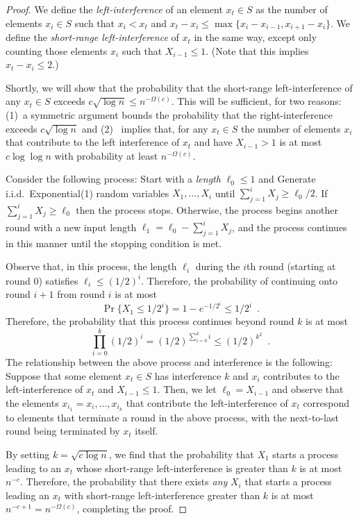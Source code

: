 \documentclass{patmorin}
\begin{document}
\begin{proof}
We define the \emph{left-interference} of an element $x_t\in S$ as
the number of elements $x_i\in S$ such that $x_i < x_t$ and $x_t-x_i
\le \max\{x_i-x_{i-1},x_{i+1}-x_i\}$.  We define the \emph{short-range
left-interference} of $x_t$ in the same way, except only counting those
elements $x_i$ such that $X_{i-1} \le 1$. (Note that this implies $x_t-x_i
\le 2$.)

Shortly, we will show that the probability that the short-range
left-interference of any $x_t\in S$ exceeds $c\sqrt{\log n}\le
n^{-\Omega(c)}$.  This will be sufficient, for two reasons: (1)~a
symmetric argument bounds the probability that the right-interference
exceeds $c\sqrt{\log n}$ and (2)~ implies that, for any
$x_t\in S$ the number of elements $x_i$ that contribute to the left
interference of $x_t$ and have $X_{i-1}>1$ is at most $c\log \log n$ with
probability at least $n^{-\Omega(c)}$.

Consider the following process: Start with a \emph{length} $\ell_0 \le 1$
and Generate i.i.d.\ Exponential(1) random variables $X_1,\ldots,X_i$
until $\sum_{j=1}^i {X_j} \ge \ell_0/2$. If $\sum_{j=1}^i {X_j} \ge
\ell_0$ then the process stops.  Otherwise, the process begins another
round with a new input length $\ell_1=\ell_0-\sum_{j=1}^i {X_j}$, and
the process continues in this manner until the stopping condition is met.

Observe that, in this process, the length $\ell_i$ during the $i$th
round (starting at round 0) satisfies $\ell_i\le (1/2)^i$.  Therefore,
the probability of continuing onto round $i+1$ from round $i$ is at most
\[
   \Pr\{X_1 \le 1/2^i\} = 1-e^{-1/2^i} \le 1/2^{i} \enspace .
\]
Therefore, the probability that this process continues beyond round $k$
is at most
\[
    \prod_{i=0}^{k} (1/2)^i = (1/2)^{\sum_{i=0}^{k} i} \le (1/2)^{k^2}
\enspace .
\]
The relationship between the above process and interference is the
following:  Suppose that some element $x_t\in S$ has interference $k$
and $x_i$ contributes to the left-interference of $x_t$ and $X_{i-1}\le
1$.  Then, we let $\ell_0=X_{i-1}$ and observe that the elements
$x_{i_1}=x_i,\ldots,x_{i_k}$ that contribute the left-interference of
$x_t$ correspond to elements that terminate a round in the above process,
with the next-to-last round being terminated by $x_t$ itself.

By setting $k=\sqrt{c\log n}$, we find that the probability that $X_{1}$
starts a process leading to an $x_t$ whose short-range left-interference is
greater than $k$ is at most $n^{-c}$.  Therefore, the probability that
there exists \emph{any} $X_i$ that starts a process leading an $x_t$ with
short-range left-interference greater than $k$ is at most
$n^{-c+1}=n^{-\Omega(c)}$, completing the proof.
\end{proof}
\end{document}
